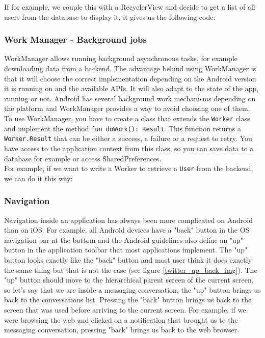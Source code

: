 \documentclass[11pt,a4paper]{report}
\begin{document}
If for example, we couple this with a RecyclerView and decide to get a list of all users from the database to display it, it gives us the following code:

\subsubsection{Work Manager - Background jobs}
WorkManager\cite{android:doc:jetpack:work_manager} allows running background asynchronous tasks, for example downloading data from a backend. The advantage behind using WorkManager is that it will choose the correct implementation depending on the Android version it is running on and the available APIs. It will also adapt to the state of the app, running or not. Android has several background work mechanisms depending on the platform and WorkManager provides a way to avoid choosing one of them.\\

To use WorkManager, you have to create a class that extends the \verb+Worker+ class and implement the method \texttt{fun doWork(): Result}. This function returns a \verb+Worker.Result+ that can be either a success, a failure or a request to retry. You have access to the application context from this class, so you can save data to a database for example or access SharedPreferences.\\

For example, if we want to write a Worker to retrieve a \verb+User+ from the backend, we can do it this way\cite{android:codelab:work_manager}:
\subsubsection{Navigation}
\label{jetpack_navigation}
Navigation inside an application has always been more complicated on Android than on iOS. For example, all Android devices have a "back" button in the OS navigation bar at the bottom and the Android guidelines also define an "up" button in the application toolbar that most applications implement. The "up" button looks exactly like the "back" button and most user think it does exactly the same thing but that is not the case (see figure \ref{twitter_up_back_img}). The "up" button should move to the hierarchical parent screen of the current screen, so let's say that we are inside a messaging conversation, the "up" button brings us back to the conversations list. Pressing the "back" button brings us back to the screen that was used before arriving to the current screen. For example, if we were browsing the web and clicked on a notification that brought us to the messaging conversation, pressing "back" brings us back to the web browser.\\
\end{document}
